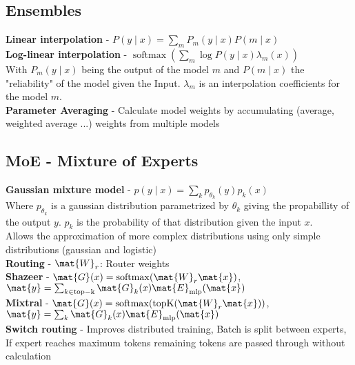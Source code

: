 \begin{multicols}{2}
\begin{mdframed}[style=eqbox]
        \subsection{Ensembles}
        \textbf{Linear interpolation} - $P(y \mid x) = \sum_m P_m(y \mid x) P(m \mid x)$\\
        \textbf{Log-linear interpolation} - $\operatorname{softmax}\left(\sum_m \log P(y \mid x) \lambda_m(x)\right)$\\
        {\tiny With $P_m(y \mid x)$ being the output of the model $m$ and $P(m \mid x)$ the "reliability" of the model given the Input. $\lambda_m$ is an interpolation coefficients for the model $m$.}\\
        \textbf{Parameter Averaging} - Calculate model weights by accumulating (average, weighted average ...) weights from multiple models
    \end{mdframed}
    \newpage

    \begin{mdframed}[style=eqbox]
        \subsection{MoE - Mixture of Experts}
        \textbf{Gaussian mixture model} - $p(y \mid x) = \sum_k p_{\theta_k}(y) p_k(x)$\\
        Where $p_{\theta_k}$ is a gaussian distribution parametrized by $\theta_k$ giving the propabillity of the output $y$. $p_k$ is the probability of that distribution given the input $x$.\\
        Allows the approximation of more complex distributions using only simple distributions (gaussian and logistic)\\[0.5em]
        \textbf{Routing} - $\mat{W}_r$: Router weights\\
        \textbf{Shazeer} - $\mat{G}(x) = \operatorname{softmax} (\mat{W}_r \mat{x})$, $\mat{y} = \sum_{k \in \mathrm{top-k}} \mat{G}_k(x) \mat{E}_\mathrm{mlp}(\mat{x})$\\
        \textbf{Mixtral} - $\mat{G}(x) = \operatorname{softmax} (\operatorname{topK} (\mat{W}_r \mat{x}))$, $\mat{y} = \sum_k \mat{G}_k(x) \mat{E}_\mathrm{mlp}(\mat{x})$\\
        \textbf{Switch routing} - Improves distributed training, Batch is split between experts, If expert reaches maximum tokens remaining tokens are passed through without calculation
    \end{mdframed}


\end{multicols}
